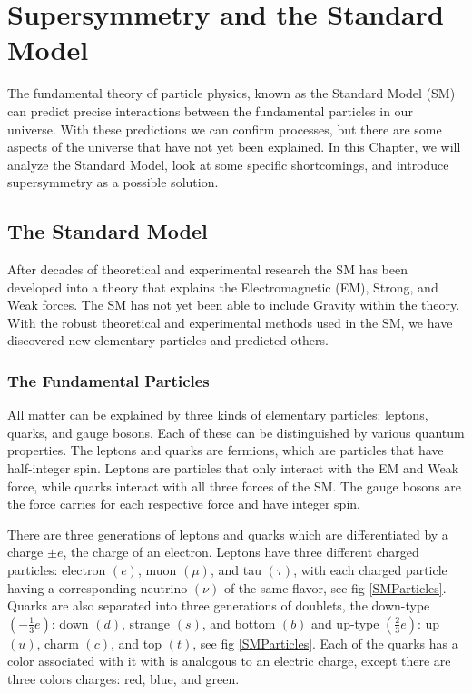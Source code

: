 \chapter{Supersymmetry and the Standard Model}
\label{ch:SUSY}

The fundamental theory of particle physics, known as the Standard Model (SM) can predict precise interactions between the fundamental particles in our universe. With these predictions we can confirm processes, but there are some aspects of the universe that have not yet been explained. In this Chapter, we will analyze the Standard Model, look at some specific shortcomings, and introduce supersymmetry as a possible solution.

\section{The Standard Model}
\label{sec:SM}

After decades of theoretical and experimental research the SM has been developed into a theory that explains the Electromagnetic (EM), Strong, and Weak forces. The SM has not yet been able to include Gravity within the theory. With the robust theoretical and experimental methods used in the SM, we have discovered new elementary particles and predicted others. 

\subsection{The Fundamental Particles}

 All matter can be explained by three kinds of elementary particles: leptons, quarks, and gauge bosons. Each of these can be distinguished by various quantum properties. The leptons and quarks are fermions, which are particles that have half-integer spin. Leptons are particles that only interact with the EM and Weak force, while quarks interact with all three forces of the SM. The gauge bosons are the force carries for each respective force and have integer spin. 
 
 There are three generations of leptons and quarks which are differentiated by a charge $\pm e$, the charge of an electron. Leptons have three different charged particles: electron $(e)$, muon $(\mu)$, and tau $(\tau)$, with each charged particle having a corresponding neutrino $(\nu)$ of the same flavor, see fig \ref{SMParticles}. Quarks are also separated into three generations of doublets, the down-type $(-\frac{1}{3}e)$: down $(d)$, strange $(s)$, and bottom $(b)$ and up-type $(\frac{2}{3}e)$: up $(u)$, charm $(c)$, and top $(t)$, see fig \ref{SMParticles}. Each of the quarks has a color associated with it with is analogous to an electric charge, except there are three colors charges: red, blue, and green.  

